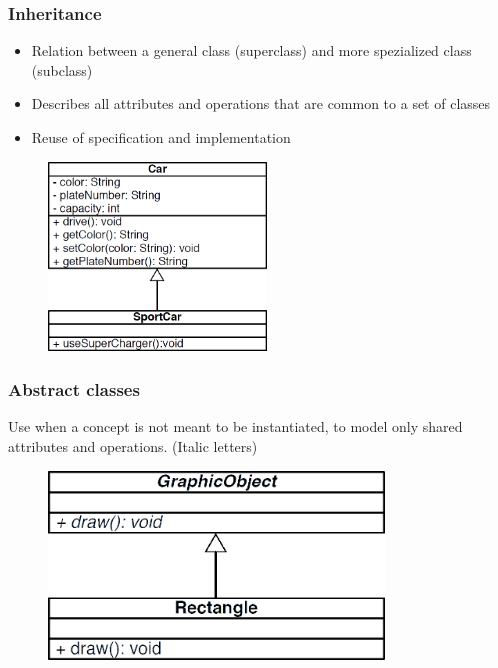 \subsubsection*{Inheritance}
\begin{itemize}
	\item Relation between a general class (superclass) and more spezialized class (subclass)
	\item Describes all attributes and operations that are common to a set of classes
	\item Reuse of specification and implementation
\end{itemize}
\begin{figure}[H]
	\centering
	\includegraphics[height=5cm,keepaspectratio]{images/oop_inheritance}
\end{figure}
\subsubsection*{Abstract classes}
Use when a concept is not meant to be instantiated, to model only shared attributes and operations. (Italic letters)
\begin{figure}[H]
	\centering
	\includegraphics[height=5cm,keepaspectratio]{images/oop_abstract_classes}
\end{figure}
